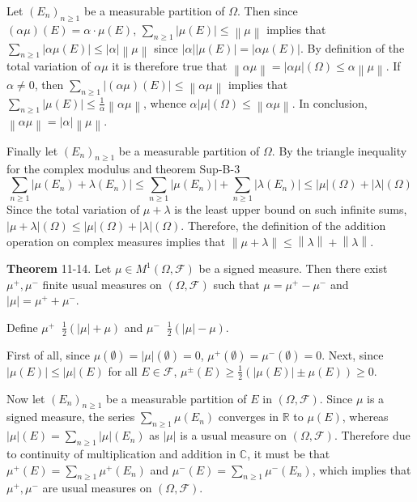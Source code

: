 \documentclass[a4paper]{article}
\newcommand{\brac}[1]{\left ( #1 \right )}
\newcommand{\abs}[1]{\left | #1 \right |}
\newcommand{\nrm}[1]{\left\| #1 \right \|}
\newcommand{\Real}{\mathbb{R}}
\newcommand{\Cplx}{\mathbb{C}}
\newcommand{\Fcal}{\mathcal{F}}
\newcommand{\defn}{\mathop{\overset{\Delta}{=}}\nolimits}
\begin{document}
Let $\brac{E_n}_{n\geq 1}$ be a measurable partition of $\Omega$. Then since $\brac{\alpha \mu} \brac{E} = \alpha\cdot \mu\brac{E}$, $\sum_{n\geq 1} \abs{\mu\brac{E}}\leq \nrm{\mu}$ implies that $\sum_{n\geq 1} \abs{\alpha \mu\brac{E}}\leq \abs{\alpha} \nrm{\mu}$ since $\abs{\alpha}\abs{\mu\brac{E}} = \abs{\alpha \mu\brac{E}}$. By definition of the total variation of $\alpha \mu$ it is therefore true that $\nrm{\alpha \mu}=\abs{\alpha \mu}\brac{\Omega}\leq \alpha \nrm{\mu}$. If $\alpha\neq 0$, then $\sum_{n\geq 1} \abs{\brac{\alpha\mu}\brac{E}}\leq \nrm{\alpha\mu}$ implies that $\sum_{n\geq 1} \abs{\mu\brac{E}}\leq \frac{1}{\alpha}\nrm{\alpha\mu}$, whence $\alpha\abs{\mu}\brac{\Omega}\leq \nrm{\alpha \mu}$. In conclusion, $\nrm{\alpha \mu} = \abs{\alpha} \nrm{\mu}$.

Finally let $\brac{E_n}_{n\geq 1}$ be a measurable partition of $\Omega$. By the triangle inequality for the complex modulus and theorem Sup-B-3 \[\sum_{n\geq1}\abs{\mu\brac{E_n}+\lambda\brac{E_n}}\leq \sum_{n\geq 1}\abs{\mu\brac{E_n}} + \sum_{n\geq 1}\abs{\lambda\brac{E_n}} \leq \abs{\mu}\brac{\Omega} + \abs{\lambda}\brac{\Omega}\] Since the total variation of $\mu+\lambda$ is the least upper bound on such infinite sums, $\abs{\mu+\lambda}\brac{\Omega}\leq \abs{\mu}\brac{\Omega} + \abs{\lambda}\brac{\Omega}$. Therefore, the definition of the addition operation on complex measures implies that $\nrm{\mu+\lambda}\leq \nrm{\lambda} +\nrm{\lambda}$.

\label{thm:signed_meas_decomp} \noindent \textbf{Theorem} 11-14.
Let $\mu\in M^1\brac{\Omega, \Fcal}$ be a signed measure. Then there exist $\mu^+, \mu^-$ finite usual measures on $\brac{\Omega, \Fcal}$ such that $\mu=\mu^+-\mu^-$ and $\abs{\mu}=\mu^++\mu^-$.

Define $\mu^+\defn \frac{1}{2}\brac{\abs{\mu} +\mu}$ and $\mu^-\defn \frac{1}{2}\brac{\abs{\mu} -\mu}$.

First of all, since $\mu\brac{\emptyset} = \abs{\mu}\brac{\emptyset}=0$, $\mu^+\brac{\emptyset}=\mu^-\brac{\emptyset}=0$. Next, since $\abs{\mu\brac{E}}\leq \abs{\mu}\brac{E}$ for all $E\in \Fcal$, $\mu^\pm\brac{E}\geq \frac{1}{2}\brac{ \abs{\mu\brac{E}} \pm \mu\brac{E}}\geq 0$.

Now let $\brac{E_n}_{n\geq1}$ be a measurable partition of $E$ in $\brac{\Omega, \Fcal}$. Since $\mu$ is a signed measure, the series $\sum_{n\geq 1}\mu\brac{E_n}$ converges in $\Real$ to $\mu\brac{E}$, whereas $\abs{\mu}\brac{E} = \sum_{n\geq1} \abs{\mu}\brac{E_n}$ as $\abs{\mu}$ is a usual measure on $\brac{\Omega, \Fcal}$. Therefore due to continuity of multiplication and addition in $\Cplx$, it must be that $\mu^+\brac{E} = \sum_{n\geq 1} \mu^+\brac{E_n}$ and $\mu^-\brac{E} = \sum_{n\geq 1} \mu^-\brac{E_n}$, which implies that $\mu^+, \mu^-$ are usual measures on $\brac{\Omega, \Fcal}$.
\end{document}
